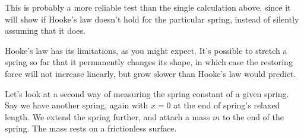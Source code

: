 \begin{figure}[H]
  \centering
{}
\caption{}\label{fig:lec10-oscillation}
\end{figure}


This is probably a more reliable test than the single calculation above, since it will show if Hooke's law doesn't hold for the particular spring, instead of silently assuming that it does.

Hooke's law has its limitations, as you might expect. It's possible to stretch a spring so far that it permanently changes its shape, in which case the restoring force will not increase linearly, but grow slower than Hooke's law would predict.

Let's look at a second way of measuring the spring constant of a given spring. Say we have another spring, again with $x = 0$ at the end of spring's relaxed length. We extend the spring further, and attach a mass $m$ to the end of the spring. The mass rests on a frictionless surface.

